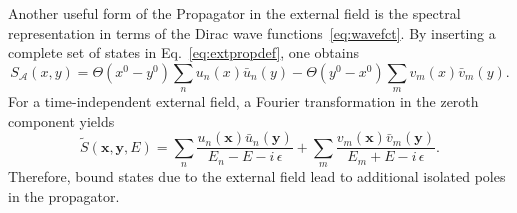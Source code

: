 %
Another useful form of the Propagator in the external field is the spectral representation in terms of the Dirac wave functions~\eqref{eq:wavefct}. By inserting a complete set of states in Eq.~\eqref{eq:extpropdef}, one obtains
\begin{equation}
S_\mathcal{A}(x,y)=\Theta(x^0-y^0) \sum_n u_n(x)\bar{u}_n(y)
-\Theta(y^0-x^0)\sum_m v_m(x)\bar{v}_m(y).
\end{equation}
For a time-independent external field, a Fourier transformation in the zeroth component yields
\begin{equation}
\tilde{S}(\mathbf{x},\mathbf{y},E)= \sum_n \frac{u_n(\mathbf{x})\bar{u}_n(\mathbf{y})}{E_n -E -i\,\epsilon}
+\sum_m \frac{v_m(\mathbf{x})\bar{v}_m(\mathbf{y})}{E_m +E -i\,\epsilon}.
\label{eq:spectralrep}
\end{equation}
Therefore, bound states due to the external field lead to additional isolated poles in the propagator.

